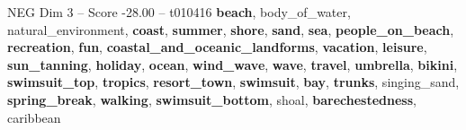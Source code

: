 \begin{textsample}{NEG Dim 3 – Score -28.00 – t010416}  \label{ex:f3_neg_008}
\textbf{beach}, body\_of\_water, natural\_environment, \textbf{coast}, \textbf{summer}, \textbf{shore}, \textbf{sand}, \textbf{sea}, \textbf{people\_on\_beach}, \textbf{recreation}, \textbf{fun}, \textbf{coastal\_and\_oceanic\_landforms}, \textbf{vacation}, \textbf{leisure}, \textbf{sun\_tanning}, \textbf{holiday}, \textbf{ocean}, \textbf{wind\_wave}, \textbf{wave}, \textbf{travel}, \textbf{umbrella}, \textbf{bikini}, \textbf{swimsuit\_top}, \textbf{tropics}, \textbf{resort\_town}, \textbf{swimsuit}, \textbf{bay}, \textbf{trunks}, singing\_sand, \textbf{spring\_break}, \textbf{walking}, \textbf{swimsuit\_bottom}, shoal, \textbf{barechestedness}, caribbean

\end{textsample}
